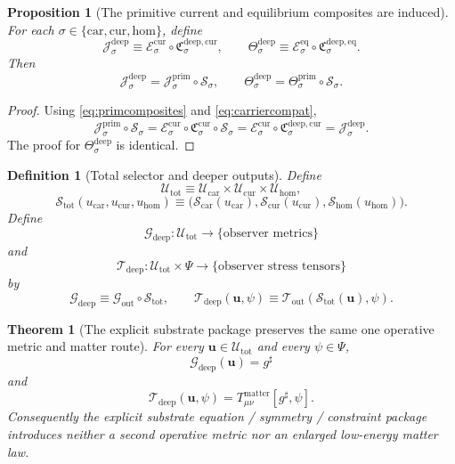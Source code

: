 \documentclass[11pt]{article}
\newcommand{\CompletedMetric}{g^{\sharp}}
\newcommand{\Car}{\mathrm{car}}
\newcommand{\Cur}{\mathrm{cur}}
\newcommand{\Hom}{\mathrm{hom}}
\newcommand{\CurrentCarrier}[1]{\mathfrak C_{#1}^{\mathrm{cur}}}
\newcommand{\CurrentExtract}[1]{\mathscr E_{#1}^{\mathrm{cur}}}
\newcommand{\EqExtract}[1]{\mathscr E_{#1}^{\mathrm{eq}}}
\newcommand{\PrimCurrent}[1]{\mathcal J_{#1}^{\mathrm{prim}}}
\newcommand{\PrimTheta}[1]{\Theta_{#1}^{\mathrm{prim}}}
\newcommand{\MetricOut}{\mathscr G_{\mathrm{out}}}
\newcommand{\MatterOut}{\mathscr T_{\mathrm{out}}}
\newcommand{\DeepMetricOut}{\mathscr G_{\mathrm{deep}}}
\newcommand{\DeepMatterOut}{\mathscr T_{\mathrm{deep}}}
\newcommand{\DeepSpace}[1]{\mathcal U_{#1}}
\newcommand{\DeepCurrentCarrier}[1]{\mathfrak C_{#1}^{\mathrm{deep,cur}}}
\newcommand{\DeepEqCarrier}[1]{\mathfrak C_{#1}^{\mathrm{deep,eq}}}
\newcommand{\ChainSelect}[1]{\mathcal S_{#1}}
\newcommand{\DeepCurrent}[1]{\mathcal J_{#1}^{\mathrm{deep}}}
\newcommand{\DeepTheta}[1]{\Theta_{#1}^{\mathrm{deep}}}
\newcommand{\DeepShell}{\mathcal U_{\mathrm{tot}}}
\newcommand{\ChainSelectTriple}{\mathcal S_{\mathrm{tot}}}
\newtheorem{definition}{Definition}
\newtheorem{proposition}{Proposition}
\newtheorem{theorem}{Theorem}
\begin{document}
\begin{proposition}[The primitive current and equilibrium composites are induced]
\label{prop:readouts}
For each \(\sigma\in\{\Car,\Cur,\Hom\}\), define
\[
\DeepCurrent{\sigma}
\equiv
\CurrentExtract{\sigma}\circ \DeepCurrentCarrier{\sigma},
\qquad
\DeepTheta{\sigma}
\equiv
\EqExtract{\sigma}\circ \DeepEqCarrier{\sigma}.
\]
Then
\begin{equation}
\DeepCurrent{\sigma}
=
\PrimCurrent{\sigma}\circ \ChainSelect{\sigma},
\qquad
\DeepTheta{\sigma}
=
\PrimTheta{\sigma}\circ \ChainSelect{\sigma}.
\label{eq:readoutpullback}
\end{equation}
\end{proposition}

\begin{proof}
Using \eqref{eq:primcomposites} and \eqref{eq:carriercompat},
\[
\PrimCurrent{\sigma}\circ \ChainSelect{\sigma}
=
\CurrentExtract{\sigma}\circ \CurrentCarrier{\sigma}\circ \ChainSelect{\sigma}
=
\CurrentExtract{\sigma}\circ \DeepCurrentCarrier{\sigma}
=
\DeepCurrent{\sigma}.
\]
The proof for \(\DeepTheta{\sigma}\) is identical.
\end{proof}

\begin{definition}[Total selector and deeper outputs]
\label{def:deepoutputs}
Define
\[
\DeepShell
\equiv
\DeepSpace{\Car}\times\DeepSpace{\Cur}\times\DeepSpace{\Hom},
\]
\[
\ChainSelectTriple(u_{\Car},u_{\Cur},u_{\Hom})
\equiv
\bigl(
\ChainSelect{\Car}(u_{\Car}),
\ChainSelect{\Cur}(u_{\Cur}),
\ChainSelect{\Hom}(u_{\Hom})
\bigr).
\]
Define
\[
\DeepMetricOut:\DeepShell\to\{\text{observer metrics}\}
\]
and
\[
\DeepMatterOut:\DeepShell\times\Psi\to\{\text{observer stress tensors}\}
\]
by
\begin{equation}
\DeepMetricOut
\equiv
\MetricOut\circ \ChainSelectTriple,
\qquad
\DeepMatterOut(\mathbf u,\psi)
\equiv
\MatterOut(\ChainSelectTriple(\mathbf u),\psi).
\label{eq:deepoutputs}
\end{equation}
\end{definition}

\begin{theorem}[The explicit substrate package preserves the same one operative metric and matter route]
\label{thm:outputs}
For every \(\mathbf u\in\DeepShell\) and every \(\psi\in\Psi\),
\begin{equation}
\DeepMetricOut(\mathbf u)=\CompletedMetric
\label{eq:deepmetric}
\end{equation}
and
\begin{equation}
\DeepMatterOut(\mathbf u,\psi)
=
T_{\mu\nu}^{\mathrm{matter}}[\CompletedMetric,\psi].
\label{eq:deepmatter}
\end{equation}
Consequently the explicit substrate equation / symmetry / constraint package introduces neither a second operative metric nor an enlarged low-energy matter law.
\end{theorem}
\end{document}

